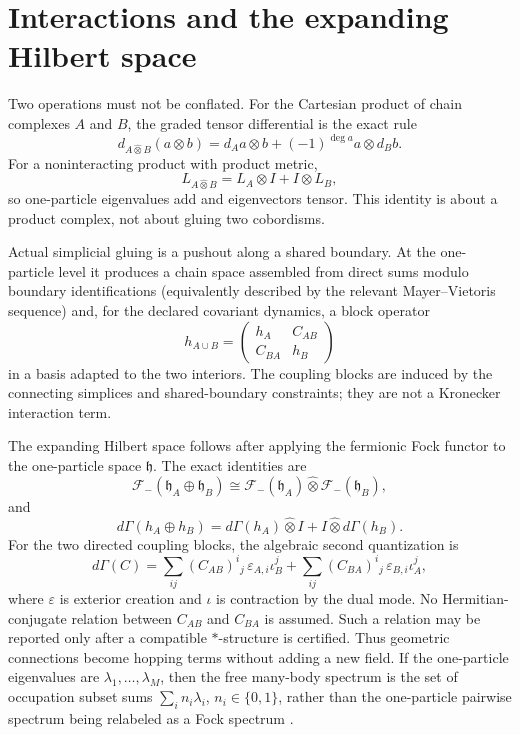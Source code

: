 \documentclass[11pt,letterpaper]{article}
\newcommand{\dG}{d\Gamma}
\newcommand{\Fock}{\mathcal{F}_{-}}
\newcommand{\hh}{\mathfrak{h}}
\newcommand{\gtens}{\mathbin{\widehat{\otimes}}}
\begin{document}
\section{Interactions and the expanding Hilbert space}\label{sec:interactions}

Two operations must not be conflated. For the Cartesian product of chain
complexes $A$ and $B$, the graded tensor differential is the exact
rule
\begin{equation*}
  d_{A\gtens B}(a\otimes b)=d_{A}a\otimes b+(-1)^{\deg a}a\otimes d_{B}b.
\end{equation*}
For a noninteracting product with product metric,
\begin{equation*}
  L_{A\gtens B}=L_{A}\otimes I+I\otimes L_{B},
\end{equation*}
so one-particle eigenvalues add and eigenvectors tensor. This identity is about
a product complex, not about gluing two cobordisms.

Actual simplicial gluing is a pushout along a shared boundary. At the
one-particle level it produces a chain space assembled from direct sums modulo
boundary identifications (equivalently described by the relevant
Mayer--Vietoris sequence) and, for the declared covariant dynamics, a block
operator
\begin{equation*}
  h_{A\cup B}=\begin{pmatrix} h_A & C_{AB}\\ C_{BA} & h_B\end{pmatrix}
\end{equation*}
in a basis adapted to the two interiors. The coupling blocks are induced by the
connecting simplices and shared-boundary constraints; they are not a Kronecker
interaction term.

The expanding Hilbert space follows after applying the fermionic Fock functor
to the one-particle space $\hh$. The exact identities are
\begin{equation*}
  \Fock(\hh_{A}\oplus\hh_{B})\cong\Fock(\hh_{A})\gtens\Fock(\hh_{B}),
\end{equation*}
and
\begin{equation*}
  \dG(h_A\oplus h_B)=\dG(h_A)\gtens I+I\gtens\dG(h_B).
\end{equation*}
For the two directed coupling blocks, the algebraic second quantization is
\begin{equation*}
  \dG(C)=
  \sum_{ij}(C_{AB})^{i}{}_{j}\,\varepsilon_{A,i}\iota_{B}^{j}
  +\sum_{ij}(C_{BA})^{i}{}_{j}\,\varepsilon_{B,i}\iota_{A}^{j},
\end{equation*}
where $\varepsilon$ is exterior creation and $\iota$ is contraction by the
dual mode. No Hermitian-conjugate relation between $C_{AB}$ and $C_{BA}$ is
assumed. Such a relation may be reported only after a compatible
$*$-structure is certified. Thus geometric connections become hopping terms
without adding a new field. If
the one-particle eigenvalues are $\lambda_{1},\dots,\lambda_{M}$, then the free
many-body spectrum is the set of occupation subset sums
$\sum_{i}n_{i}\lambda_{i}$, $n_{i}\in\{0,1\}$, rather than the one-particle
pairwise spectrum being relabeled as a Fock spectrum \cite{berezin1966}.
\end{document}
